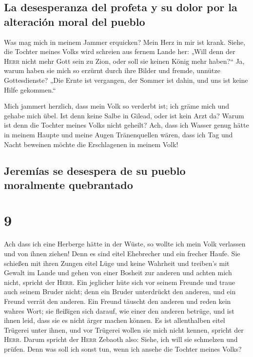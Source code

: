 \hypertarget{la-desesperanza-del-profeta-y-su-dolor-por-la-alteraciuxf3n-moral-del-pueblo}{%
\subsection{La desesperanza del profeta y su dolor por la alteración
moral del
pueblo}\label{la-desesperanza-del-profeta-y-su-dolor-por-la-alteraciuxf3n-moral-del-pueblo}}

 Was mag mich in meinem Jammer erquicken? Mein Herz in
mir ist krank.  Siehe, die Tochter meines Volks wird
schreien aus fernem Lande her: „Will denn der \textsc{Herr} nicht mehr
Gott sein zu Zion, oder soll sie keinen König mehr haben?{}`` Ja, warum
haben sie mich so erzürnt durch ihre Bilder und fremde, unnütze
Gottesdienste?  „Die Ernte ist vergangen, der Sommer ist
dahin, und uns ist keine Hilfe gekommen.``

 Mich jammert herzlich, dass mein Volk so verderbt ist;
ich gräme mich und gehabe mich übel.  Ist denn keine
Salbe in Gilead, oder ist kein Arzt da? Warum ist denn die Tochter
meines Volks nicht geheilt?  Ach, dass ich Wasser genug
hätte in meinem Haupte und meine Augen Tränenquellen wären, dass ich Tag
und Nacht beweinen möchte die Erschlagenen in meinem Volk!

\hypertarget{jeremuxedas-se-desespera-de-su-pueblo-moralmente-quebrantado}{%
\subsection{Jeremías se desespera de su pueblo moralmente
quebrantado}\label{jeremuxedas-se-desespera-de-su-pueblo-moralmente-quebrantado}}

\hypertarget{section-8}{%
\section{9}\label{section-8}}

 Ach dass ich eine Herberge hätte in der Wüste, so wollte
ich mein Volk verlassen und von ihnen ziehen! Denn es sind eitel
Ehebrecher und ein frecher Haufe.  Sie schießen mit ihren
Zungen eitel Lüge und keine Wahrheit und treiben's mit Gewalt im Lande
und gehen von einer Bosheit zur anderen und achten mich nicht, spricht
der \textsc{Herr}.  Ein jeglicher hüte sich vor seinem
Freunde und traue auch seinem Bruder nicht; denn ein Bruder unterdrückt
den anderen, und ein Freund verrät den anderen.  Ein
Freund täuscht den anderen und reden kein wahres Wort; sie fleißigen
sich darauf, wie einer den anderen betrüge, und ist ihnen leid, dass sie
es nicht ärger machen können.  Es ist allenthalben eitel
Trügerei unter ihnen, und vor Trügerei wollen sie mich nicht kennen,
spricht der \textsc{Herr}.  Darum spricht der
\textsc{Herr} Zebaoth also: Siehe, ich will sie schmelzen und prüfen.
Denn was soll ich sonst tun, wenn ich ansehe die Tochter meines Volks?

